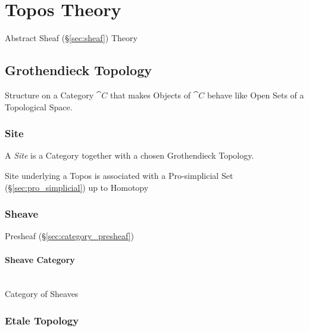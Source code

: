 \section{Topos Theory}\label{sec:topos_theory}

Abstract Sheaf (\S\ref{sec:sheaf}) Theory



\subsection{Grothendieck Topology}\label{sec:grothendieck_topology}

Structure on a Category $\cat{C}$ that makes Objects of
$\cat{C}$ behave like Open Sets of a Topological Space.



\subsubsection{Site}\label{sec:site}

A \emph{Site} is a Category together with a chosen Grothendieck
Topology.

Site underlying a Topos is associated with a Pro-simplicial Set
(\S\ref{sec:pro_simplicial}) up to Homotopy



\subsubsection{Sheave}\label{sec:sheave}

Presheaf (\S\ref{sec:category_presheaf})



\paragraph{Sheave Category}\label{sec:sheave_category}
\hfill \\

Category of Sheaves



\subsubsection{Etale Topology}\label{sec:etale_topology}



